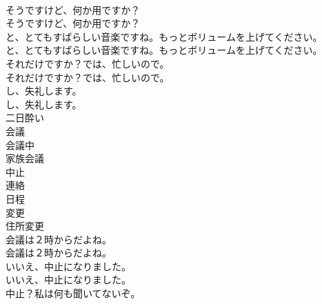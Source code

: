 \documentclass[8pt]{extreport}
\begin{document}
\begin{CJK}{UTF8}{min}
\\	そうですけど、何か用ですか？	
\\	そうですけど、何か用ですか？ 
\\	と、とてもすばらしい音楽ですね。もっとボリュームを上げてください。	
\\	と、とてもすばらしい音楽ですね。もっとボリュームを上げてください。 
\\	それだけですか？では、忙しいので。	
\\	それだけですか？では、忙しいので。 
\\	し、失礼します。	
\\	し、失礼します。 
\\	二日酔い
\\	会議
\\	会議中
\\	家族会議
\\	中止
\\	連絡
\\	日程
\\	変更
\\	住所変更
\\	会議は２時からだよね。	
\\	会議は２時からだよね。 
\\	いいえ、中止になりました。	
\\	いいえ、中止になりました。 
\\	中止？私は何も聞いてないぞ。	
\end{CJK}
\end{document}

